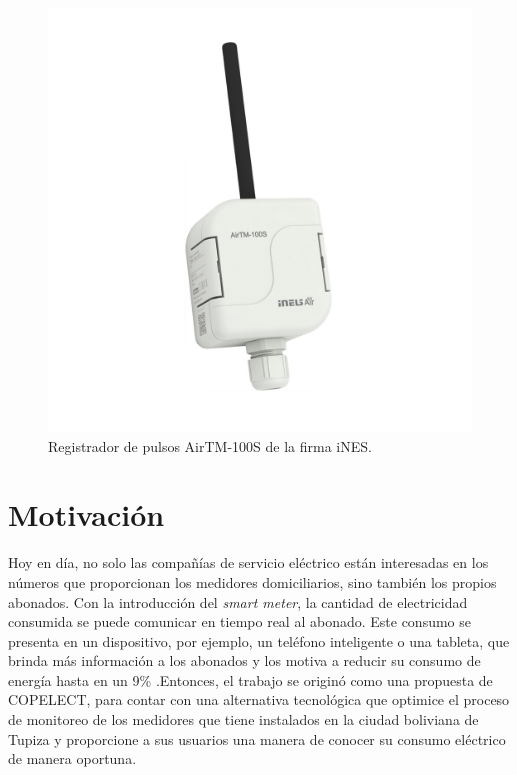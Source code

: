 \begin{itemize}
	\begin{figure}[h]
		\centering
		\includegraphics[scale=0.22]{./Figures/airtm-100s.png}
		\caption{Registrador de pulsos AirTM-100S de la firma iNES\protect\footnotemark.}
		\label{fig:cuadradoAzul}
	\end{figure}	
\end{itemize}



\section{Motivación}

Hoy en día, no solo las compañías de servicio eléctrico están interesadas en los números que proporcionan los medidores domiciliarios, sino también los propios abonados. Con la introducción del \textit{smart meter}, la cantidad de electricidad consumida se puede comunicar en tiempo real al abonado. Este consumo se presenta en un dispositivo, por ejemplo, un teléfono inteligente o una tableta, que brinda más información a los abonados y los motiva a reducir su consumo de energía hasta en un 9\% \citep{WEBSITE:8}.Entonces, el trabajo se originó como una propuesta de COPELECT, para contar con una alternativa tecnológica que optimice el proceso de monitoreo de los medidores que tiene instalados en la ciudad boliviana de Tupiza y proporcione a sus usuarios una manera de conocer su consumo eléctrico de manera oportuna.

